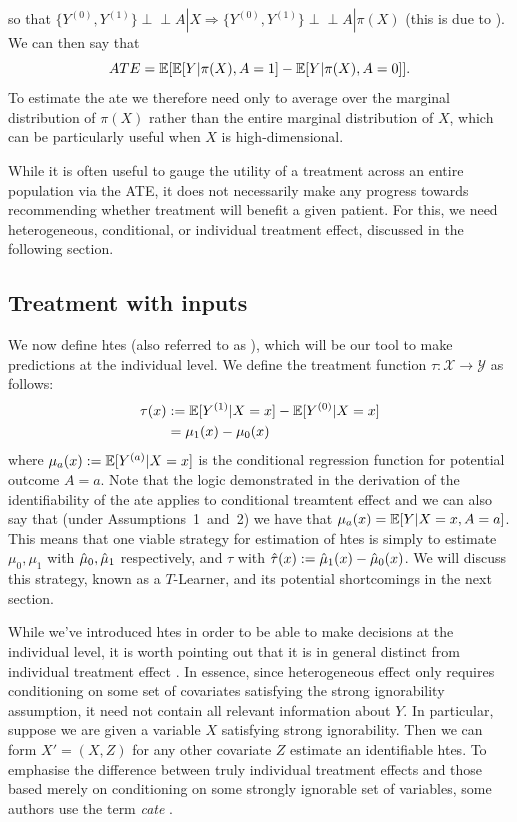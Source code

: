 \documentclass[../thesis.tex]{subfiles}
\begin{document}
so that $\{Y^{(0)}, Y^{(1)}\} \perp\!\!\!\perp A | X \Rightarrow \{Y^{(0)}, Y^{(1)}\} \perp\!\!\!\perp A | \pi(X)$ (this is due to \citealt{rosenbaum_central_1983}). We can then say that
\[ATE = \mathbb{E}[\mathbb{E}[Y|\pi(X), A=1] - \mathbb{E}[Y|\pi(X), A=0]].\]
To estimate the \gls{ate} we therefore need only to average over the marginal distribution of $\pi(X)$ rather than the entire marginal distribution of $X$, which can be particularly useful when $X$ is high-dimensional.

While it is often useful to gauge the utility of a treatment across an entire population via the ATE, it does not necessarily make any progress towards recommending whether treatment will benefit a given patient. For this, we need heterogeneous, conditional, or individual treatment effect, discussed in the following section.

\subsection{Treatment with inputs}
We now define \glspl{hte} (also referred to as 
), which will be our tool to make predictions at the individual level. We define the treatment function $\tau: \mathcal{X} \rightarrow \mathcal{Y}$ as follows:
\begin{align*}
    \tau(x) & := \mathbb{E}[Y^{(1)} | X =x] - \mathbb{E}[Y^{(0)} | X=x] \\
    & = \mu_1(x) - \mu_0(x) 
\end{align*}
where $\mu_a(x) := \mathbb{E}[Y^{(a)}|X=x]$ is the conditional regression function for potential outcome $A=a$. Note that the logic demonstrated in the derivation of the identifiability of the \gls{ate} applies to conditional treamtent effect and we can also say that (under Assumptions~1~and~2) we have that $\mu_a(x) = \mathbb{E}[Y|X=x,A=a]$. This means that one viable strategy for estimation of \glspl{hte} is simply to estimate $\mu_0,\mu_1$ with $\hat{\mu}_0, \hat{\mu}_1$ respectively, and $\tau$ with $\hat{\tau}(x) := \hat{\mu}_1(x) - \hat{\mu}_0(x)$. We will discuss this strategy, known as a $T$-Learner, and its potential shortcomings in the next section.

While we've introduced \glspl{hte} in order to be able to make decisions at the individual level, it is worth pointing out that it is in general distinct from individual treatment effect \citep{vegetabile_distinction_2021}. In essence, since heterogeneous effect only requires conditioning on some set of covariates satisfying the strong ignorability assumption, it need not contain all relevant information about $Y$. In particular, suppose we are given a variable $X$ satisfying strong ignorability. Then we can form $X'=(X,Z)$ for any other covariate $Z$ estimate an identifiable \glspl{hte}. To emphasise the difference between truly individual treatment effects and those based merely on conditioning on some strongly ignorable set of variables, some authors use the term \emph{\gls{cate}} \citep{vegetabile_distinction_2021}.
\end{document}
